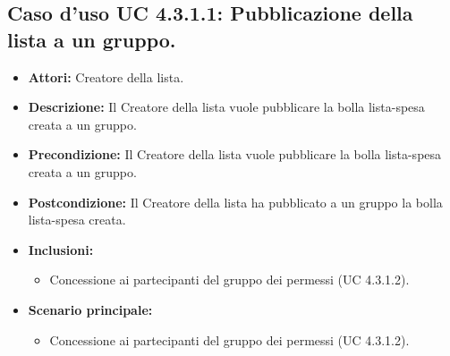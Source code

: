 \subsection{Caso d'uso UC 4.3.1.1: Pubblicazione della lista a un gruppo.}
\label{Caso d'uso UC 4.3.1.1: Pubblicazione della lista a un gruppo.}

\FloatBarrier
\begin{itemize}
\item \textbf{Attori:} Creatore della lista.
\item \textbf{Descrizione:} Il Creatore della lista vuole pubblicare la bolla lista-spesa creata a un gruppo.
\item \textbf{Precondizione:} Il Creatore della lista vuole pubblicare la bolla lista-spesa creata a un gruppo. 
\item \textbf{Postcondizione:} Il Creatore della lista ha pubblicato a un gruppo la bolla lista-spesa creata.
\item \textbf{Inclusioni:}
	\begin{itemize}
	\item{Concessione ai partecipanti del gruppo dei permessi (UC 4.3.1.2).}
	\end{itemize}
\item \textbf{Scenario principale:}
	\begin{itemize}
	\item{Concessione ai partecipanti del gruppo dei permessi (UC 4.3.1.2).}
	\end{itemize}
\end{itemize}